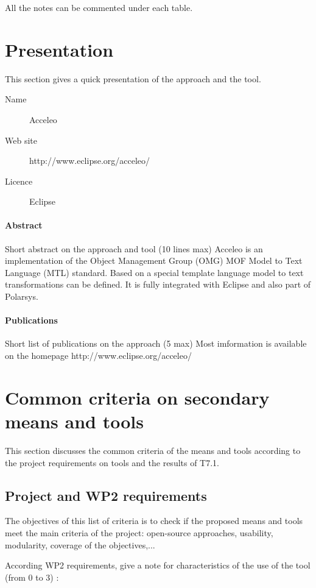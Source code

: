 All the notes can be commented under each table.

\section{Presentation}

This section gives a quick presentation of the approach and the tool.

\begin{description}
\item[Name] Acceleo
\item[Web site] http://www.eclipse.org/acceleo/
\item[Licence] Eclipse
\end{description}

\paragraph{Abstract} Short abstract on the approach and tool (10 lines max)
Acceleo is an implementation of the Object Management Group (OMG) MOF Model to Text Language (MTL) standard. Based on a special template language model to text transformations can be defined. It is fully integrated with Eclipse and also part of Polarsys.

\paragraph{Publications} Short list of publications on the approach (5 max)
Most imformation is available on the homepage http://www.eclipse.org/acceleo/

\section{Common criteria on secondary means and tools}
\label{common}
This section discusses the common criteria of the means and tools according to the project requirements on tools and the results of T7.1.

\subsection{Project and WP2 requirements}

The objectives of this list of criteria is to check if the proposed means and tools meet the main criteria of the project: open-source approaches, usability, modularity, coverage of the objectives,...

According WP2 requirements, give a note for characteristics of the use of the tool (from 0 to 3) :

